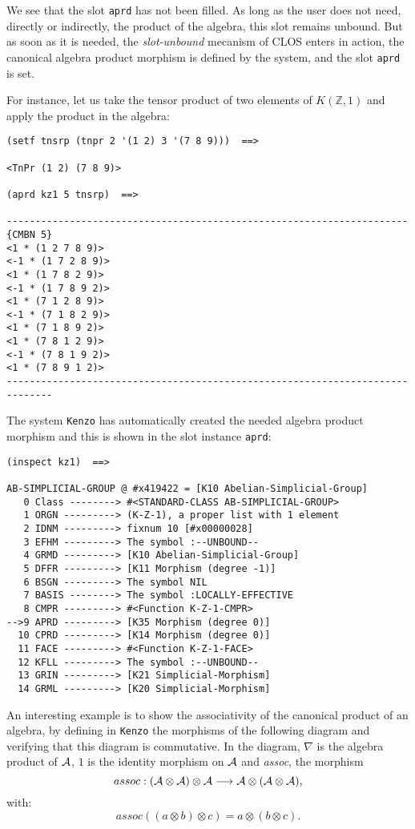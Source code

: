 We see that  the slot {\tt aprd} has not been filled. As long as the user does not  need, directly or indirectly,
the product of the algebra, this slot remains unbound. But as soon as it is needed, the {\em slot-unbound}
mecanism of CLOS enters in action, the canonical algebra product morphism is defined by the system, and the slot
{\tt aprd} is set.\par
For instance, let us take the tensor product of two elements of  $K(\mathbb{Z}, 1)$ and apply the
product in the algebra:
{\footnotesize\begin{verbatim}
(setf tnsrp (tnpr 2 '(1 2) 3 '(7 8 9)))  ==>

<TnPr (1 2) (7 8 9)>

(aprd kz1 5 tnsrp)  ==>

----------------------------------------------------------------------{CMBN 5}
<1 * (1 2 7 8 9)>
<-1 * (1 7 2 8 9)>
<1 * (1 7 8 2 9)>
<-1 * (1 7 8 9 2)>
<1 * (7 1 2 8 9)>
<-1 * (7 1 8 2 9)>
<1 * (7 1 8 9 2)>
<1 * (7 8 1 2 9)>
<-1 * (7 8 1 9 2)>
<1 * (7 8 9 1 2)>
------------------------------------------------------------------------------
\end{verbatim}}
The system {\tt Kenzo} has automatically created the needed algebra product morphism  and
this is shown in the slot instance {\tt aprd}:
{\footnotesize\begin{verbatim}
(inspect kz1)  ==>

AB-SIMPLICIAL-GROUP @ #x419422 = [K10 Abelian-Simplicial-Group]
   0 Class --------> #<STANDARD-CLASS AB-SIMPLICIAL-GROUP>
   1 ORGN ---------> (K-Z-1), a proper list with 1 element
   2 IDNM ---------> fixnum 10 [#x00000028]
   3 EFHM ---------> The symbol :--UNBOUND--
   4 GRMD ---------> [K10 Abelian-Simplicial-Group]
   5 DFFR ---------> [K11 Morphism (degree -1)]
   6 BSGN ---------> The symbol NIL
   7 BASIS --------> The symbol :LOCALLY-EFFECTIVE
   8 CMPR ---------> #<Function K-Z-1-CMPR>
-->9 APRD ---------> [K35 Morphism (degree 0)]
  10 CPRD ---------> [K14 Morphism (degree 0)]
  11 FACE ---------> #<Function K-Z-1-FACE>
  12 KFLL ---------> The symbol :--UNBOUND--
  13 GRIN ---------> [K21 Simplicial-Morphism]
  14 GRML ---------> [K20 Simplicial-Morphism]
\end{verbatim}}

An interesting example is to show the associativity of the canonical product of
an algebra, by defining in {\tt Kenzo} the morphisms of the following diagram
and verifying that this diagram is commutative. In the diagram, $\nabla$ is the
algebra product of ${\cal A}$, $1$ is the identity morphism on ${\cal A}$ and
{\em assoc}, the morphism
$$assoc: ({\cal A}\otimes {\cal A}) \otimes {\cal A} \longrightarrow {\cal A} \otimes ({\cal A}\otimes {\cal A}),$$
with:
$$assoc((a\otimes b)\otimes c) = a \otimes (b \otimes c).$$

